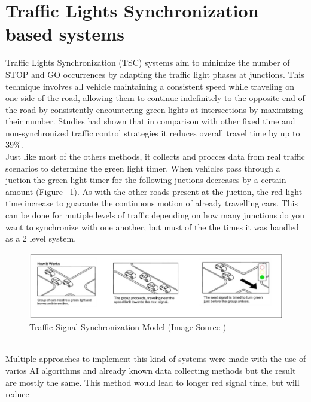 \documentclass[17pt]{report}
\begin{document}
\section{Traffic Lights Synchronization based systems}
\indent \indent
Traffic Lights Synchronization (TSC) \cite{Tomar2022} systems aim  to minimize
the number of STOP and GO occurrences by adapting the traffic light phases at junctions.
This technique involves all vehicle maintaining a consistent speed while traveling on one side
of the road, allowing them to continue indefinitely to the opposite end of the road by consistently
encountering green lights at intersections by maximizing their number.
Studies had shown that in comparison with other fixed time and
non-synchronized traffic control strategies it reduces overall travel time by
up to 39\%. \cite{ALEKO2019}\\
\indent \indent
Just like most of the others methods, it collects and procces data from real traffic
scenarios to determine the green light timer. When vehicles pass through a juction the
green light timer for the following juctions decreases by a certain amount
(Figure ~\ref{fig:TrafficSignalSynchronization}). As with the other roads present at
the juction, the red light time increase to guarante the continuous motion of already
travelling cars. This can be done for mutiple levels of traffic depending on how many
junctions do you want to synchronize with one another, but must of the the times it
was handled as a 2 level system.
\begin{figure}[h!]
    \includegraphics[width=\textwidth]{TrafficSignalSynchronization.jpg}
    \caption{Traffic Signal Synchronization Model 
    (\href{https://www.cityofirvine.org/signal-operations-maintenance/traffic-signal-synchronization}{Image Source} \textcopyright)}
    \label{fig:TrafficSignalSynchronization}
\end{figure}\\
\indent \indent
Multiple approaches to implement this kind of systems were made with the use of
varios AI algorithms and already known data collecting methods but the result are
mostly the same. This method would lead to longer red signal time, but will reduce
\end{document}
